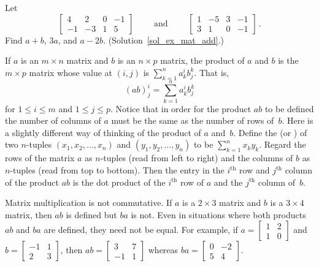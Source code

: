 \begin{exer}\label{ex_mat_add} Let
 \[ \begin{bmatrix}
              4  &  2  &  0  & -1  \\
             -1  & -3  &  1  &  5
    \end{bmatrix} \qquad \text{ and } \qquad
    \begin{bmatrix}
              1  & -5  &  3  & -1  \\
              3  &  1  &  0  & -1
    \end{bmatrix}\,. \]
Find $a + b$, $3a$, and $a - 2b$.   (Solution~\ref{sol_ex_mat_add}.)
\end{exer}

If $a$ is an $m \times n$ matrix and $b$ is an $n \times p$ matrix, the product of $a$ and $b$
is the $m \times p$ matrix whose value at $(i,j)$ is $\sum_{k=1}^n a_k^i b_j^k$.  That is,
 \[ (ab)_j^i = \sum_{k=1}^n a_k^i b_j^k\]
for $1 \le i \le m$ and $1 \le j \le p$.  Notice that in order for the product
$ab$ to be defined the number of columns of $a$ must be the same as the number of rows of~$b$.
Here is a slightly different way of thinking of the product of $a$ and~$b$.  Define the
 (or
) of two $n$-tuples $(x_1,x_2,\dots, x_n)$ and $(y_1,y_2,\dots, y_n)$ to be
$\sum_{k=1}^n x_k y_k$.  Regard the rows of the matrix $a$ as $n$-tuples (read from left to
right) and the columns of $b$ as $n$-tuples (read from top to bottom).  Then the entry in the
$i^{\text{th}}$ row and $j^{\text{th}}$ column of the product $ab$ is the dot product of the
$i^{\text{th}}$ row of $a$ and the $j^{\text{th}}$ column of~$b$.

\begin{exam} Matrix multiplication is not commutative.  If $a$ is a $2 \times 3$ matrix and
$b$ is a $3 \times 4$ matrix, then $ab$ is defined but $ba$ is not.  Even in situations where
both products $ab$ and $ba$ are defined, they need not be equal.  For example, if $a =
\begin{bmatrix} 1 & 2 \\ 1 & 0 \end{bmatrix}$ and $b = \begin{bmatrix} -1 & 1 \\ 2 & 3
\end{bmatrix}$, then $ab =
\begin{bmatrix} 3 & 7 \\ -1 & 1 \end{bmatrix}$ whereas $ba =
\begin{bmatrix} 0 & -2 \\ 5 & 4 \end{bmatrix}$.
\end{exam}


